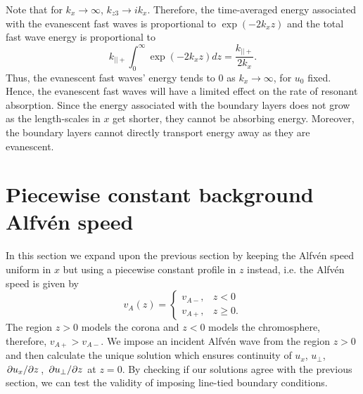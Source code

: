 \documentclass[linenumbers]{aastex63}
\begin{document}
Note that for $k_x\rightarrow\infty$, $k_{z3}\rightarrow ik_x$. Therefore, the time-averaged energy associated with the evanescent fast waves is proportional to $\exp(-2k_x z)$ and the total fast wave
energy is proportional to
\begin{equation}
    k_{||+}\int_0^\infty \exp(-2 k_x z) dz = \frac{k_{||+}}{2k_x}.
\end{equation}
Thus, the evanescent fast waves' energy tends to 0 as $k_x\rightarrow \infty$, for $u_0$ fixed. Hence, the evanescent fast waves will have a limited effect on the rate of resonant absorption. Since the energy associated with the boundary layers does not grow as the length-scales in $x$ get shorter, they cannot be absorbing energy. Moreover, the boundary layers cannot directly transport energy away as they are evanescent.

\section{Piecewise constant background Alfv\'en speed}
\label{sec:piecewise_constant_alfven_speed}

In this section we expand upon the previous section by keeping the Alfv\'en speed uniform in $x$ but using a piecewise constant profile in $z$ instead, i.e. the Alfv\'en speed is given by
\begin{equation}
    v_A(z) = \begin{cases}
    v_{A-}, & z < 0 \\
    v_{A+}, & z \ge 0.
    \end{cases}
\end{equation}
The region $z>0$ models the corona and $z<0$ models the chromosphere, therefore, $v_{A+} > v_{A-}$. We impose an incident Alfv\'en wave from the region $z>0$ and then calculate the unique solution which ensures continuity of $u_x$, $u_\perp$, $\pdv*{u_x}{z}$, $\pdv*{u_\perp}{z}$ at $z=0$. By checking if our solutions agree with the previous section, we can test the validity of imposing line-tied boundary conditions.
\end{document}
